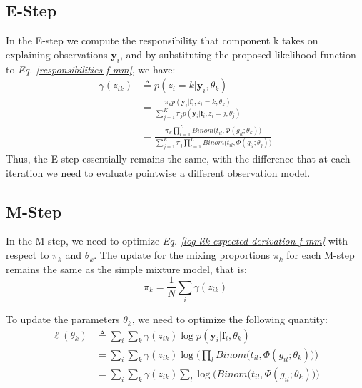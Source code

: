 \subsection{E-Step}
In the E-step we compute the responsibility that component k takes on explaining observations $\mathbf{y}_{i}$, and by substituting the proposed likelihood function to \emph{Eq. \ref{responsibilities-f-mm}}, we have:
\begin{equation} \label{responsibilities-binom-prob-model-f-meth}
  \begin{split}
	\gamma(z_{ik}) & \triangleq p(z_{i}=k|\mathbf{y}_{i},\theta_{k}) \\
				   & = \frac{\pi_{k}p(\mathbf{y}_{i}|\mathbf{f}_{i},z_{i}=k,\theta_{k})}{\sum\limits_{j=1}^{K} \pi_{j}p(\mathbf{y}_{i}|\mathbf{f}_{i},z_{i}=j,\theta_{j})} \\
				   & = \frac{\pi_{k} \prod\limits_{l=1}^{L} Binom \big(t_{il}, \Phi(g_{il}; \theta_{k})\big)} {\sum\limits_{j=1}^{K} \pi_{j} \prod\limits_{l=1}^{L} Binom \big(t_{il}, \Phi(g_{il}; \theta_{j})\big)}
  \end{split}
\end{equation}
Thus, the E-step essentially remains the same, with the difference that at each iteration we need to evaluate pointwise a different observation model. 

\subsection{M-Step}
In the M-step, we need to optimize \emph{Eq. \ref{log-lik-expected-derivation-f-mm}} with respect to $\pi_{k}$ and $\theta_{k}$. The update for the mixing proportions $\pi_{k}$ for each M-step remains the same as the simple mixture model, that is:
\begin{equation} \label{mixing-proportions-binom-prob-est-f-meth}
		\pi_{k} = \frac{1}{N} \sum_{i} \gamma(z_{ik})
\end{equation}

To update the parameters $\theta_{k}$, we need to optimize the following quantity:
\begin{equation} \label{parameters-est2-binom-prob-EM-f-meth}
  \begin{split}
	\ell(\theta_{k}) & \triangleq \sum_{i} \sum_{k} \gamma(z_{ik}) \log p(\mathbf{y}_{i}|\mathbf{f}_{i}, \theta_{k}) \\
					 & = \sum_{i} \sum_{k} \gamma(z_{ik}) \log \bigg( \prod_{l} Binom \big(t_{il}, \Phi(g_{il}; \theta_{k})\big) \bigg)\\
					 & = \sum_{i} \sum_{k} \gamma(z_{ik}) \sum_{l} \log \bigg(Binom \big(t_{il}, \Phi(g_{il}; \theta_{k})\big) \bigg)
  \end{split}
\end{equation}

